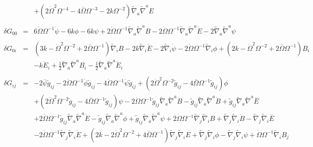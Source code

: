 \documentclass[10pt,letterpaper]{article}
\numberwithin{equation}{section}
\begin{document}
\begin{eqnarray}
&& + (2 \dot{\Omega}^2 \Omega^{-4} - 4 \overset{..}{\Omega} \Omega^{-3} - 2 k \Omega^{-2}) \tilde{\nabla}_{a}\tilde{\nabla}^{a}E
\\ \nonumber\\
\delta G_{00}&=& 6 \dot{\Omega} \Omega^{-1} \dot{\psi} - 6 k \phi - 6 k \psi + 2 \dot{\Omega} \Omega^{-1} \tilde{\nabla}_{a}\tilde{\nabla}^{a}B - 2 \dot{\Omega} \Omega^{-1} \tilde{\nabla}_{a}\tilde{\nabla}^{a}\dot{E} - 2 \tilde{\nabla}_{a}\tilde{\nabla}^{a}\psi 
\\  \nonumber\\ 
\delta G_{0i}&=& (3 k -  \dot{\Omega}^2 \Omega^{-2} + 2 \overset{..}{\Omega} \Omega^{-1}) \tilde{\nabla}_{i}B - 2 k \tilde{\nabla}_{i}\dot{E} - 2 \tilde{\nabla}_{i}\dot{\psi} - 2 \dot{\Omega} \Omega^{-1} \tilde{\nabla}_{i}\phi +(2 k -  \dot{\Omega}^2 \Omega^{-2} + 2 \overset{..}{\Omega} \Omega^{-1}) B_{i} \nonumber \\ 
&& -  k \dot{E}_{i} + \tfrac{1}{2} \tilde{\nabla}_{a}\tilde{\nabla}^{a}B_{i} -  \tfrac{1}{2} \tilde{\nabla}_{a}\tilde{\nabla}^{a}\dot{E}_{i}
\\  \nonumber\\ 
\delta G_{ij}&=& -2 \overset{..}{\psi} \tilde{g}_{ij} - 2 \dot{\Omega} \Omega^{-1} \dot{\phi} \tilde{g}_{ij} - 4 \dot{\Omega} \Omega^{-1} \dot{\psi} \tilde{g}_{ij} + (2 \dot{\Omega}^2 \Omega^{-2} \tilde{g}_{ij} - 4 \overset{..}{\Omega} \Omega^{-1} \tilde{g}_{ij}) \phi \nonumber \\ 
&& + (2 \dot{\Omega}^2 \Omega^{-2} \tilde{g}_{ij} - 4 \overset{..}{\Omega} \Omega^{-1} \tilde{g}_{ij}) \psi - 2 \dot{\Omega} \Omega^{-1} \tilde{g}_{ij} \tilde{\nabla}_{a}\tilde{\nabla}^{a}B -  \tilde{g}_{ij} \tilde{\nabla}_{a}\tilde{\nabla}^{a}\dot{B} + \tilde{g}_{ij} \tilde{\nabla}_{a}\tilde{\nabla}^{a}\overset{..}{E} \nonumber \\ 
&& + 2 \dot{\Omega} \Omega^{-1} \tilde{g}_{ij} \tilde{\nabla}_{a}\tilde{\nabla}^{a}\dot{E} -  \tilde{g}_{ij} \tilde{\nabla}_{a}\tilde{\nabla}^{a}\phi + \tilde{g}_{ij} \tilde{\nabla}_{a}\tilde{\nabla}^{a}\psi + 2 \dot{\Omega} \Omega^{-1} \tilde{\nabla}_{j}\tilde{\nabla}_{i}B + \tilde{\nabla}_{j}\tilde{\nabla}_{i}\dot{B} -  \tilde{\nabla}_{j}\tilde{\nabla}_{i}\overset{..}{E} \nonumber \\ 
&& - 2 \dot{\Omega} \Omega^{-1} \tilde{\nabla}_{j}\tilde{\nabla}_{i}\dot{E} + (2 k - 2 \dot{\Omega}^2 \Omega^{-2} + 4 \overset{..}{\Omega} \Omega^{-1}) \tilde{\nabla}_{j}\tilde{\nabla}_{i}E + \tilde{\nabla}_{j}\tilde{\nabla}_{i}\phi -  \tilde{\nabla}_{j}\tilde{\nabla}_{i}\psi +\dot{\Omega} \Omega^{-1} \tilde{\nabla}_{i}B_{j} \nonumber \\ 

\end{eqnarray}
\end{document}
